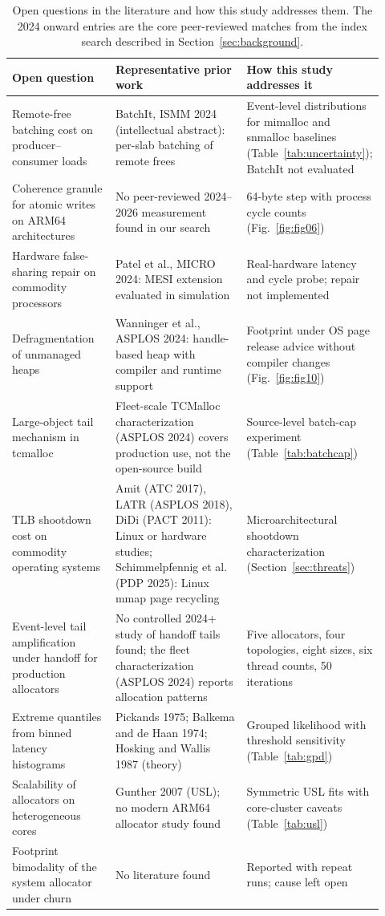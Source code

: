 \begin{table}[!htbp]
\centering
\footnotesize
\setlength{\tabcolsep}{3pt}
\caption{Open questions in the literature and how this study addresses them. The 2024 onward entries are the core peer-reviewed matches from the index search described in Section~\ref{sec:background}.}
\label{tab:gaps}
\begin{tabular}{p{0.28\linewidth}p{0.36\linewidth}p{0.28\linewidth}}
\toprule
Open question & Representative prior work & How this study addresses it\\
\midrule
Remote-free batching cost on producer--consumer loads & BatchIt, ISMM 2024 (intellectual abstract): per-slab batching of remote frees & Event-level distributions for mimalloc and snmalloc baselines (Table~\ref{tab:uncertainty}); BatchIt not evaluated \\
Coherence granule for atomic writes on ARM64 architectures & No peer-reviewed 2024--2026 measurement found in our search & 64-byte step with process cycle counts (Fig.~\ref{fig:fig06}) \\
Hardware false-sharing repair on commodity processors & Patel et al., MICRO 2024: MESI extension evaluated in simulation & Real-hardware latency and cycle probe; repair not implemented \\
Defragmentation of unmanaged heaps & Wanninger et al., ASPLOS 2024: handle-based heap with compiler and runtime support & Footprint under OS page release advice without compiler changes (Fig.~\ref{fig:fig10}) \\
Large-object tail mechanism in tcmalloc & Fleet-scale TCMalloc characterization (ASPLOS 2024) covers production use, not the open-source build & Source-level batch-cap experiment (Table~\ref{tab:batchcap}) \\
TLB shootdown cost on commodity operating systems & Amit (ATC 2017), LATR (ASPLOS 2018), DiDi (PACT 2011): Linux or hardware studies; Schimmelpfennig et al. (PDP 2025): Linux mmap page recycling & Microarchitectural shootdown characterization (Section~\ref{sec:threats}) \\
Event-level tail amplification under handoff for production allocators & No controlled 2024+ study of handoff tails found; the fleet characterization (ASPLOS 2024) reports allocation patterns & Five allocators, four topologies, eight sizes, six thread counts, 50 iterations \\
Extreme quantiles from binned latency histograms & Pickands 1975; Balkema and de Haan 1974; Hosking and Wallis 1987 (theory) & Grouped likelihood with threshold sensitivity (Table~\ref{tab:gpd}) \\
Scalability of allocators on heterogeneous cores & Gunther 2007 (USL); no modern ARM64 allocator study found & Symmetric USL fits with core-cluster caveats (Table~\ref{tab:usl}) \\
Footprint bimodality of the system allocator under churn & No literature found & Reported with repeat runs; cause left open \\
\bottomrule
\end{tabular}
\end{table}
